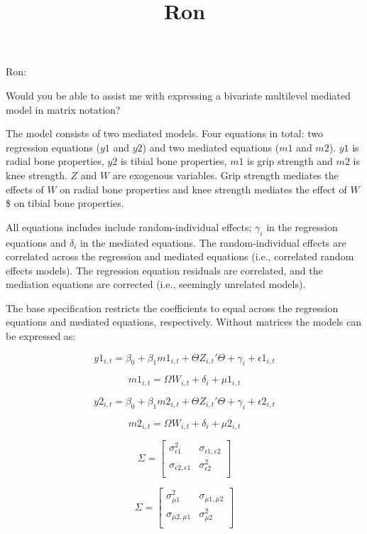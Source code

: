 \documentclass[11pt]{article}
\title{Ron}
\begin{document}
    
    
    \maketitle
    
    

    
    Ron:

Would you be able to assist me with expressing a bivariate multilevel
mediated model in matrix notation?

The model consists of two mediated models. Four equations in total: two
regression equations (\(y1\) and \(y2\)) and two mediated equations
(\(m1\) and \(m2\)). \(y1\) is radial bone properties, \(y2\) is tibial
bone properties, \(m1\) is grip strength and \(m2\) is knee strength.
\(Z\) and \(W\) are exogenous variables. Grip strength mediates the
effects of \(W\) on radial bone properties and knee strength mediates
the effect of \(W\)\$ on tibial bone properties.

All equations includes include random-individual effects; \(\gamma_i\)
in the regression equations and \(\delta_i\) in the mediated equations.
The random-individual effects are correlated across the regression and
mediated equations (i.e., correlated random effects models). The
regression equation residuals are correlated, and the mediation
equations are corrected (i.e., seemingly unrelated models).

The base specification restricts the coefficients to equal across the
regression equations and mediated equations, respectively. Without
matrices the models can be expressed as:

\[ 
y1_{i,t} = \beta_0 + \beta_1 m1_{i,t} + \Theta Z_{i,t}' \Theta + \gamma_{i} + \epsilon1_{i,t} 
\]

\[
m1_{i,t} = \Omega W_{i,t} + \delta_{i} + \mu1_{i,t} 
\]

\[ 
y2_{i,t} = \beta_0 + \beta_1 m2_{i,t} + \Theta Z_{i,t}' \Theta + \gamma_{i} + \epsilon2_{i,t} 
\]

\[ 
m2_{i,t} = \Omega W_{i,t} + \delta_{i} + \mu2_{i,t} 
\]

\[ 
\Sigma = 
\begin{bmatrix}
 \sigma^2_{\epsilon1} & \sigma_{\epsilon1, \epsilon2}  \\
 \sigma_{\epsilon2, \epsilon1} & \sigma^2_{\epsilon2}  \\
\end{bmatrix} 
\]

\[ 
\Sigma = 
\begin{bmatrix}
 \sigma^2_{\mu1} & \sigma_{\mu1, \mu2}  \\
 \sigma_{\mu2, \mu1} & \sigma^2_{\mu2}  \\
\end{bmatrix} 
\]
\end{document}
